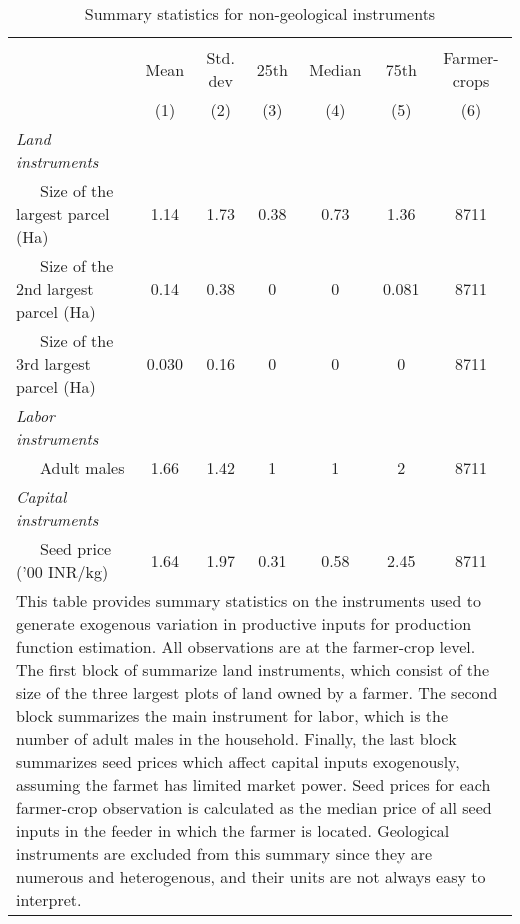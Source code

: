 \begin{table}[htbp]\centering
\def\sym#1{\ifmmode^{#1}\else\(^{#1}\)\fi}
\caption{Summary statistics for non-geological instruments}
\begin{tabular*}{1.0\hsize}{@{\hskip\tabcolsep\extracolsep\fill}l*{1}{cccccc}}
\toprule
                                    &\multicolumn{6}{c}{}                                                         \\
                                    &        Mean&    Std. dev&        25th&      Median&        75th&Farmer-crops\\
&\multicolumn{1}{c}{(1)}&\multicolumn{1}{c}{(2)}&\multicolumn{1}{c}{(3)}&\multicolumn{1}{c}{(4)}&\multicolumn{1}{c}{(5)}&\multicolumn{1}{c}{(6)}\\
\midrule
\emph{Land instruments}             &            &            &            &            &            &            \\
~~~Size of the largest parcel (Ha)  &        1.14&        1.73&        0.38&        0.73&        1.36&        8711\\
~~~Size of the 2nd largest parcel (Ha)&        0.14&        0.38&           0&           0&       0.081&        8711\\
~~~Size of the 3rd largest parcel (Ha)&       0.030&        0.16&           0&           0&           0&        8711\\
\emph{Labor instruments}            &            &            &            &            &            &            \\
~~~Adult males                      &        1.66&        1.42&           1&           1&           2&        8711\\
\emph{Capital instruments}          &            &            &            &            &            &            \\
~~~Seed price ('00 INR/kg)          &        1.64&        1.97&        0.31&        0.58&        2.45&        8711\\
\bottomrule
\multicolumn{7}{p{\hsize}}{\footnotesize This table provides summary statistics on the instruments used to generate exogenous variation in productive inputs for production function estimation.
All observations are at the farmer-crop level.
The first block of summarize land instruments, which consist of the size of the three largest plots of land owned by a farmer.
The second block summarizes the main instrument for labor, which is the number of adult males in the household.
Finally, the last block summarizes seed prices which affect capital inputs exogenously, assuming the farmet has limited market power.
Seed prices for each farmer-crop observation is calculated as the median price of all seed inputs in the feeder in which the farmer is located.
Geological instruments are excluded from this summary since they are numerous and heterogenous, and their units are not always easy to interpret.}
\end{tabular*}
\end{table}
